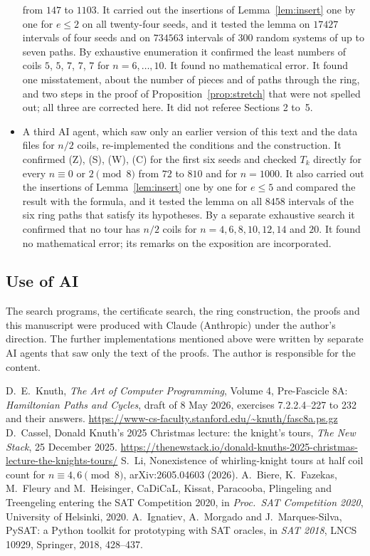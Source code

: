 \documentclass[11pt]{amsart}
\theoremstyle{remark}
\begin{document}
\begin{itemize}
from $147$ to $1103$. It carried out the insertions of Lemma~\ref{lem:insert} one by one for $e\le2$ on all
twenty-four seeds, and it tested the lemma on $17427$ intervals of four seeds and on $734563$ intervals of $300$
random systems of up to seven paths. By exhaustive enumeration it confirmed the least numbers of coils $5$, $5$,
$7$, $7$, $7$ for $n=6,\dots,10$. It found no mathematical error. It found one misstatement, about the number of
pieces and of paths through the ring, and two steps in the proof of Proposition~\ref{prop:stretch} that were not
spelled out; all three are corrected here. It did not referee Sections 2 to~5.
\item A third AI agent, which saw only an earlier version of this text and the data files for $n/2$ coils,
re-implemented the conditions and the construction. It confirmed (Z), (S), (W), (C) for the first six seeds and
checked $T_k$ directly for every $n\equiv0$ or $2\pmod 8$ from $72$ to $810$ and for $n=1000$. It also carried out the insertions of Lemma~\ref{lem:insert} one by one for
$e\le5$ and compared the result with the formula, and it tested the lemma on all $8458$ intervals of the six ring
paths that satisfy its hypotheses. By a separate exhaustive search it confirmed that no tour has $n/2$ coils for
$n=4,6,8,10,12,14$ and $20$. It found no mathematical error; its remarks on the exposition are incorporated.
\end{itemize}

\subsection*{Use of AI}
The search programs, the certificate search, the ring construction, the proofs and this manuscript were produced
with Claude (Anthropic) under the author's direction. The further implementations mentioned above were written by separate AI agents that
saw only the text of the proofs. The author is responsible for the content.

\begin{thebibliography}{9}
 D.~E.~Knuth, \emph{The Art of Computer Programming}, Volume 4, Pre-Fascicle 8A: \emph{Hamiltonian
Paths and Cycles}, draft of 8 May 2026, exercises 7.2.2.4--227 to 232 and their answers.
\url{https://www-cs-faculty.stanford.edu/~knuth/fasc8a.ps.gz}
 D.~Cassel, Donald Knuth's 2025 Christmas lecture: the knight's tours, \emph{The New Stack},
25 December 2025. \url{https://thenewstack.io/donald-knuths-2025-christmas-lecture-the-knights-tours/}
 S.~Li, Nonexistence of whirling-knight tours at half coil count for $n\equiv4,6\pmod 8$,
arXiv:2605.04603 (2026).
 A.~Biere, K.~Fazekas, M.~Fleury and M.~Heisinger, CaDiCaL, Kissat, Paracooba, Plingeling and
Treengeling entering the SAT Competition 2020, in \emph{Proc.\ SAT Competition 2020}, University of Helsinki, 2020.
 A.~Ignatiev, A.~Morgado and J.~Marques-Silva, PySAT: a Python toolkit for prototyping with SAT
oracles, in \emph{SAT 2018}, LNCS 10929, Springer, 2018, 428--437.
\end{thebibliography}
\end{document}
